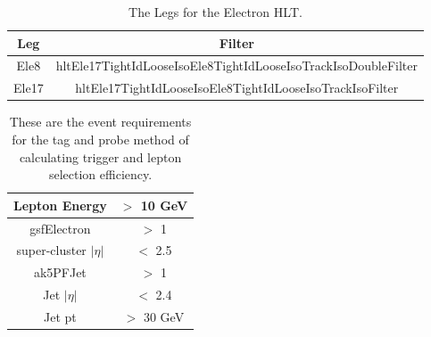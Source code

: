\begin{table}[htb]
\caption{%
The Legs for the Electron HLT.
}
\begin{center}
  \begin{tabular}{ | c | c |} \hline
    Leg & Filter \\ \hline \hline
    Ele8 & hltEle17TightIdLooseIsoEle8TightIdLooseIsoTrackIsoDoubleFilter \\ \hline
    Ele17 & hltEle17TightIdLooseIsoEle8TightIdLooseIsoTrackIsoFilter \\ \hline
  \end{tabular}
\end{center}
\label{tab:trigger_stuff}
\end{table}



\begin{table}[htb]
\caption{%
  These are the event requirements for the tag and probe method of calculating trigger and lepton selection efficiency.
}
\begin{center}
  \begin{tabular}{ | c | c |} \hline
    Lepton Energy & $>$ 10 GeV \\ \hline
    gsfElectron & $>$ 1 \\ \hline
    super-cluster $|\eta|$ &  $<$ 2.5 \\ \hline
    ak5PFJet  & $>$ 1 \\ \hline
    Jet $|\eta|$ & $<$ 2.4 \\ \hline
    Jet pt & $>$ 30 GeV \\ \hline
  \end{tabular}
\end{center}
\label{tab:tagandprobe_requirements}
\end{table}


